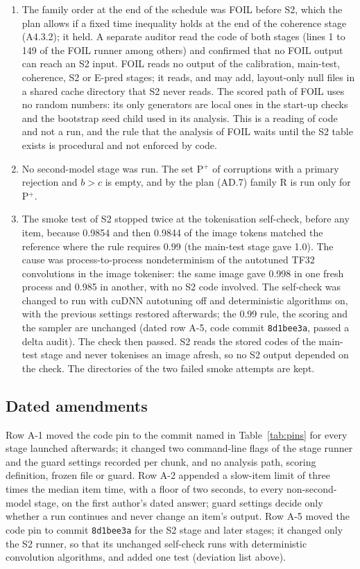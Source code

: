 \begin{enumerate}
\item The family order at the end of the schedule was FOIL before S2, which the plan allows if a fixed time inequality holds at the
end of the coherence stage (A4.3.2); it held. A separate auditor read the code of both stages (lines 1 to 149 of the FOIL runner among
others) and confirmed that no FOIL output can reach an S2 input. FOIL reads no output of the calibration, main-test, coherence, S2 or
E-pred stages; it reads, and may add, layout-only null files in a shared cache directory that S2 never reads. The scored path of FOIL uses
no random numbers: its only generators are local ones in the start-up checks and the bootstrap seed child used in its analysis. This is
a reading of code and not a run, and the rule that the analysis of FOIL waits until the S2 table exists is procedural and not enforced
by code.
\item No second-model stage was run. The set P$^+$ of corruptions with a primary rejection and $b>c$ is empty, and by the plan
(AD.7) family R is run only for P$^+$.
\item The smoke test of S2 stopped twice at the tokenisation self-check, before any item, because 0.9854 and then 0.9844 of the image
tokens matched the reference where the rule requires 0.99 (the main-test stage gave 1.0). The cause was process-to-process
nondeterminism of the autotuned TF32 convolutions in the image tokeniser: the same image gave 0.998 in one fresh process and 0.985 in
another, with no S2 code involved. The self-check was changed to run with cuDNN autotuning off and deterministic algorithms on, with the
previous settings restored afterwards; the 0.99 rule, the scoring and the sampler are unchanged (dated row A-5, code commit
\texttt{8d1bee3a}, passed a delta audit). The check then passed. S2 reads the stored codes of the main-test stage and never tokenises an
image afresh, so no S2 output depended on the check. The directories of the two failed smoke attempts are kept.
\end{enumerate}

\subsection{Dated amendments}\label{app:amend}
Row A-1 moved the code pin to the commit named in Table~\ref{tab:pins} for every stage launched afterwards; it changed two
command-line flags of the stage runner and the guard settings recorded per chunk, and no analysis path, scoring definition, frozen
file or guard.
Row A-2 appended a slow-item limit of three times the median item time, with a floor of two seconds, to every non-second-model
stage, on the first author's dated answer; guard settings decide only whether a run continues and never change an item's output.
Row A-5 moved the code pin to commit \texttt{8d1bee3a} for the S2 stage and later stages; it changed only the S2 runner, so that its
unchanged self-check runs with deterministic convolution algorithms, and added one test (deviation list above).

